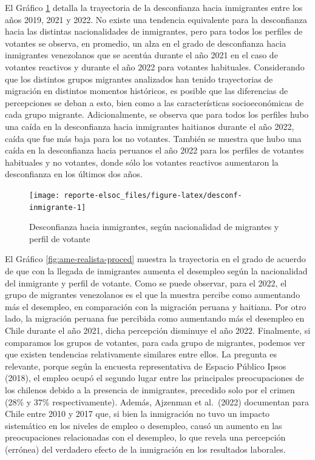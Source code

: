\documentclass[
  12pt,
]{book}
\begin{document}
El Gráfico \ref{fig:desconf-inmigrante} detalla la trayectoria de la desconfianza hacia inmigrantes entre los años 2019, 2021 y 2022. No existe una tendencia equivalente para la desconfianza hacia las distintas nacionalidades de inmigrantes, pero para todos los perfiles de votantes se observa, en promedio, un alza en el grado de desconfianza hacia inmigrantes venezolanos que se acentúa durante el año 2021 en el caso de votantes reactivos y durante el año 2022 para votantes habituales. Considerando que los distintos grupos migrantes analizados han tenido trayectorias de migración en distintos momentos históricos, es posible que las diferencias de percepciones se deban a esto, bien como a las características socioeconómicas de cada grupo migrante. Adicionalmente, se observa que para todos los perfiles hubo una caída en la desconfianza hacia inmigrantes haitianos durante el año 2022, caída que fue más baja para los no votantes. También se muestra que hubo una caída en la desconfianza hacia peruanos el año 2022 para los perfiles de votantes habituales y no votantes, donde sólo los votantes reactivos aumentaron la desconfianza en los últimos dos años.

\begin{figure}

{\centering \texttt{[image: reporte-elsoc\_files/figure-latex/desconf-inmigrante-1]} 

}

\caption{Desconfianza hacia inmigrantes, según nacionalidad de migrantes y perfil de votante}\label{fig:desconf-inmigrante}
\end{figure}

El Gráfico \ref{fig:ame-realista-proced} muestra la trayectoria en el grado de acuerdo de que con la llegada de inmigrantes aumenta el desempleo según la nacionalidad del inmigrante y perfil de votante. Como se puede observar, para el 2022, el grupo de migrantes venezolanos es el que la muestra percibe como aumentando más el desempleo, en comparación con la migración peruana y haitiana. Por otro lado, la migración peruana fue percibida como aumentando más el desempleo en Chile durante el año 2021, dicha percepción disminuye el año 2022. Finalmente, si comparamos los grupos de votantes, para cada grupo de migrantes, podemos ver que existen tendencias relativamente similares entre ellos. La pregunta es relevante, porque según la encuesta representativa de Espacio Público Ipsos (2018), el empleo ocupó el segundo lugar entre las principales preocupaciones de los chilenos debido a la presencia de inmigrantes, precedido solo por el crimen (28\% y 37\% respectivamente). Además, Ajzenman et al.~(2022) documentan para Chile entre 2010 y 2017 que, si bien la inmigración no tuvo un impacto sistemático en los niveles de empleo o desempleo, causó un aumento en las preocupaciones relacionadas con el desempleo, lo que revela una percepción (errónea) del verdadero efecto de la inmigración en los resultados laborales.
\end{document}
